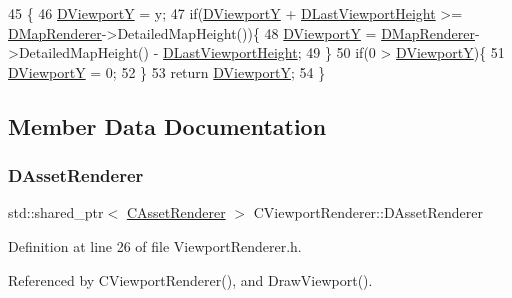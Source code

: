 \begin{DoxyCode}
45                                      \{
46     \hyperlink{classCViewportRenderer_ae13dd437a3da3d2bab16bc7ba61cb78f}{DViewportY} = y;
47     \textcolor{keywordflow}{if}(\hyperlink{classCViewportRenderer_ae13dd437a3da3d2bab16bc7ba61cb78f}{DViewportY} + \hyperlink{classCViewportRenderer_aaca5c330615fc2aacc57dede8e7c18b0}{DLastViewportHeight} >= 
      \hyperlink{classCViewportRenderer_ac6bc7771bd6dcd35107d25bebb0c0a4c}{DMapRenderer}->DetailedMapHeight())\{
48         \hyperlink{classCViewportRenderer_ae13dd437a3da3d2bab16bc7ba61cb78f}{DViewportY} = \hyperlink{classCViewportRenderer_ac6bc7771bd6dcd35107d25bebb0c0a4c}{DMapRenderer}->DetailedMapHeight() - 
      \hyperlink{classCViewportRenderer_aaca5c330615fc2aacc57dede8e7c18b0}{DLastViewportHeight};
49     \}
50     \textcolor{keywordflow}{if}(0 > \hyperlink{classCViewportRenderer_ae13dd437a3da3d2bab16bc7ba61cb78f}{DViewportY})\{
51         \hyperlink{classCViewportRenderer_ae13dd437a3da3d2bab16bc7ba61cb78f}{DViewportY} = 0;
52     \}
53     \textcolor{keywordflow}{return} \hyperlink{classCViewportRenderer_ae13dd437a3da3d2bab16bc7ba61cb78f}{DViewportY};
54 \}
\end{DoxyCode}


\subsection{Member Data Documentation}
\hypertarget{classCViewportRenderer_a3daa075c87bbdde4d1ada41f0b98f4a8}{}\label{classCViewportRenderer_a3daa075c87bbdde4d1ada41f0b98f4a8} 
\subsubsection{\texorpdfstring{D\+Asset\+Renderer}{DAssetRenderer}}
{\footnotesize\ttfamily std\+::shared\+\_\+ptr$<$ \hyperlink{classCAssetRenderer}{C\+Asset\+Renderer} $>$ C\+Viewport\+Renderer\+::\+D\+Asset\+Renderer\hspace{0.3cm}{\ttfamily [protected]}}



Definition at line 26 of file Viewport\+Renderer.\+h.



Referenced by C\+Viewport\+Renderer(), and Draw\+Viewport().

\hypertarget{classCViewportRenderer_a2fa9d183d00bdba4a2fea6d946992608}{}\label{classCViewportRenderer_a2fa9d183d00bdba4a2fea6d946992608} 
